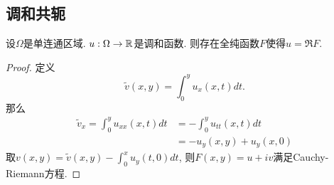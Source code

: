 \subsection{调和共轭}
\begin{proposition}
    设$\Omega$是单连通区域. $u: \Omega \to \mathbb{R}$是调和函数. 则存在全纯函数$F$使得$u=\Re F$.
\end{proposition}
\begin{proof}
    定义
    \begin{equation}
        \tilde{v}(x,y)= \int^y_0 u_x(x,t)dt. 
    \end{equation}
    那么
    \begin{equation}
        \begin{split}
            \tilde{v}_x  =\int^y_0 u_{xx}(x,t)dt &=- \int^y_0 u_{tt}(x,t)dt \\
            &= -u_y(x,y)+u_y(x,0)
        \end{split}
    \end{equation}
    取$v(x,y)=\tilde{v}(x,y)- \int^x_0 u_y(t,0)dt$, 则$F(x,y)=u+iv$满足Cauchy-Riemann方程.
\end{proof}

